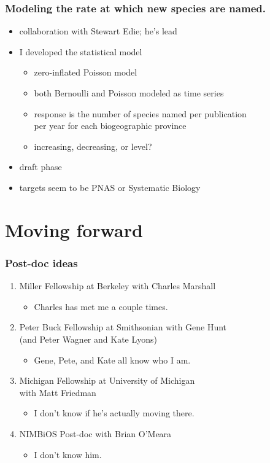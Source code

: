 \documentclass{beamer}
\begin{document}
\begin{frame}
  \frametitle{Modeling the rate at which new species are named.}
  \begin{itemize}
    \item collaboration with Stewart Edie; he's lead
    \item I developed the statistical model
      \begin{itemize}
        \item zero-inflated Poisson model 
        \item both Bernoulli and Poisson modeled as time series
        \item response is the number of species named per publication \\per year for each biogeographic province
        \item increasing, decreasing, or level?
      \end{itemize}
    \item draft phase
    \item targets seem to be PNAS or Systematic Biology
  \end{itemize}
\end{frame}


\section{Moving forward}

\begin{frame}
  \frametitle{Post-doc ideas}
  \begin{enumerate}
    \item Miller Fellowship at Berkeley with Charles Marshall
      \begin{itemize}
        \item Charles has met me a couple times.
      \end{itemize}
    \item Peter Buck Fellowship at Smithsonian with Gene Hunt \\(and Peter Wagner and Kate Lyons)
      \begin{itemize}
        \item Gene, Pete, and Kate all know who I am.
      \end{itemize}
    \item Michigan Fellowship at University of Michigan \\with Matt Friedman
      \begin{itemize}
        \item I don't know if he's actually moving there.
      \end{itemize}
    \item NIMBiOS Post-doc with Brian O'Meara
      \begin{itemize}
        \item I don't know him.
      \end{itemize}
  \end{enumerate}
\end{frame}
\end{document}
